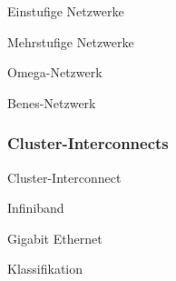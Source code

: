 \begin{defi}{Einstufige Netzwerke}

\end{defi}

\begin{defi}{Mehrstufige Netzwerke}

\end{defi}

\begin{defi}{Omega-Netzwerk}

\end{defi}

\begin{defi}{Benes-Netzwerk}

\end{defi}

\subsubsection{Cluster-Interconnects}

\begin{defi}{Cluster-Interconnect}

\end{defi}

\begin{defi}{Infiniband}

\end{defi}

\begin{defi}{Gigabit Ethernet}

\end{defi}

\begin{defi}[Verbindungsnetzwerk]{Klassifikation}

\end{defi}

